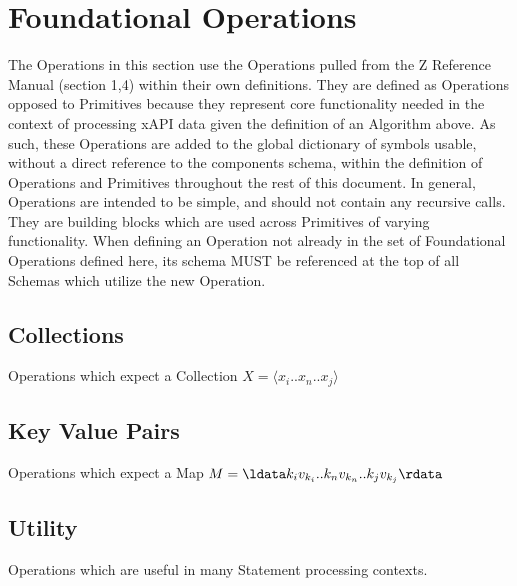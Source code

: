 \documentclass{article}
\begin{document}





\section{Foundational Operations}
The Operations in this section use the Operations pulled from the Z Reference Manual (section 1,4) within their own definitions.
They are defined as Operations opposed to Primitives because they represent core functionality needed in the context
of processing xAPI data given the definition of an Algorithm above. As such, these Operations are added to the global
dictionary of symbols usable, without a direct reference to the components schema, within the definition of
Operations and Primitives throughout the rest of this document. In general, Operations are intended to be
simple, and should not contain any recursive calls. They are building blocks which are used across Primitives
of varying functionality. When defining an Operation not already in the set of Foundational Operations defined here, its schema
MUST be referenced at the top of all Schemas which utilize the new Operation.

\subsection{Collections}
Operations which expect a Collection $X = \langle x_{i}..x_{n}..x_{j} \rangle$






\subsection{Key Value Pairs}
Operations which expect a Map $M = \ldata k_{i}v_{k_{i}}..k_{n}v_{k_{n}}..k_{j}v_{k_{j}} \rdata$






\subsection{Utility}
Operations which are useful in many Statement processing contexts.




\end{document}
